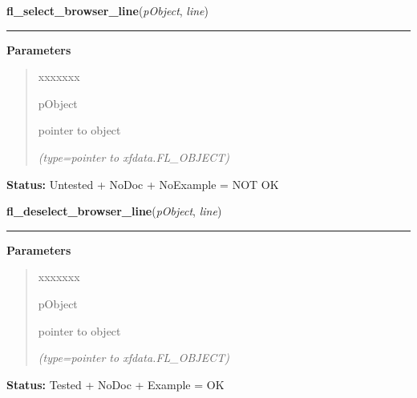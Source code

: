\hspace{.8\funcindent}\begin{boxedminipage}{\funcwidth}

    \raggedright \textbf{fl\_select\_browser\_line}(\textit{pObject}, \textit{line})

    \vspace{-1.5ex}

    \rule{\textwidth}{0.5\fboxrule}
\setlength{\parskip}{2ex}
\setlength{\parskip}{1ex}
      \textbf{Parameters}
      \vspace{-1ex}

      \begin{quote}
        \begin{Ventry}{xxxxxxx}

          \item[pObject]

          pointer to object

            {\it (type=pointer to xfdata.FL\_OBJECT)}

        \end{Ventry}

      \end{quote}

\textbf{Status:} Untested + NoDoc + NoExample = NOT OK



    \end{boxedminipage}

    \label{xformslib:library:fl_deselect_browser_line}

    \vspace{0.5ex}

\hspace{.8\funcindent}\begin{boxedminipage}{\funcwidth}

    \raggedright \textbf{fl\_deselect\_browser\_line}(\textit{pObject}, \textit{line})

    \vspace{-1.5ex}

    \rule{\textwidth}{0.5\fboxrule}
\setlength{\parskip}{2ex}
\setlength{\parskip}{1ex}
      \textbf{Parameters}
      \vspace{-1ex}

      \begin{quote}
        \begin{Ventry}{xxxxxxx}

          \item[pObject]

          pointer to object

            {\it (type=pointer to xfdata.FL\_OBJECT)}

        \end{Ventry}

      \end{quote}

\textbf{Status:} Tested + NoDoc + Example = OK



    \end{boxedminipage}

